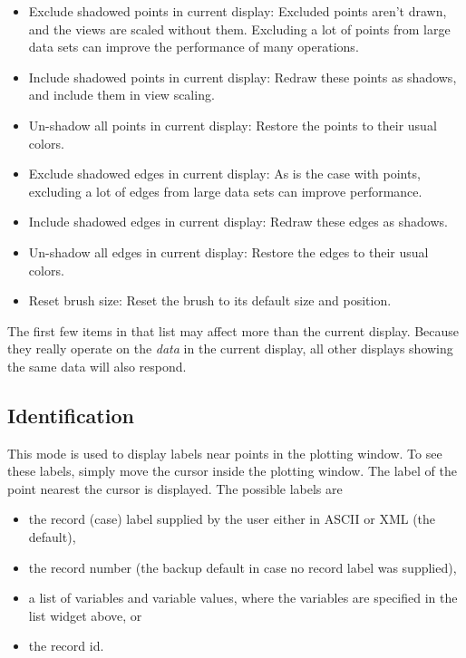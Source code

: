 \documentclass[11pt]{article}
\begin{document}
\begin{itemize}
 \item Exclude shadowed points in current display: Excluded points
       aren't drawn, and the views are scaled without them.  Excluding
       a lot of points from large data sets can improve the performance
       of many operations.
 \item Include shadowed points in current display: Redraw these points
       as shadows, and include them in view scaling.
 \item Un-shadow all points in current display: Restore the points to
       their usual colors.
 \item Exclude shadowed edges in current display: As is the case with
       points, excluding a lot of edges from large data sets can
       improve performance.
 \item Include shadowed edges in current display: Redraw these edges
       as shadows.
 \item Un-shadow all edges in current display: Restore the edges to their
       usual colors.
 \item Reset brush size: Reset the brush to its default size and position.
\end{itemize}
The first few items in that list may affect more than the current
display.  Because they really operate on the {\em data} in the current
display, all other displays showing the same data will also respond.

\subsection{Identification}
\label{slbl:Identify}

This mode is used to display labels near points in the plotting window.
To see these labels, simply move the cursor inside the plotting window.
The label of the point nearest the cursor is displayed.  The possible
labels are

\begin{itemize} \itemsep 0em
\item the record (case) label supplied by the user either in ASCII
      or XML (the default),
\item the record number (the backup default in case no record label was
      supplied),
\item a list of variables and variable values, where the variables are
      specified in the list widget above, or
\item the record id.
\end{itemize}
\end{document}
